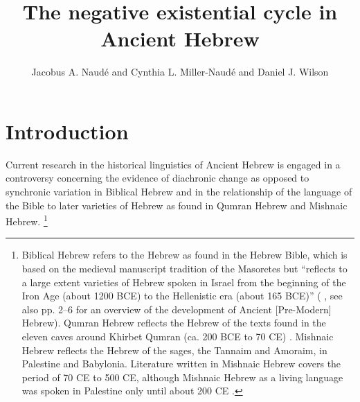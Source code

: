 \documentclass[output=paper,colorlinks,citecolor=brown,draft,draftmode]{langscibook}
\author{Jacobus A. Naudé\affiliation{University of the Free State} and Cynthia L. Miller-Naudé\affiliation{University of the Free State} and Daniel J. Wilson\affiliation{University of the Free State}
}
\title{The negative existential cycle in Ancient Hebrew}
\begin{document}
\maketitle

\section{Introduction}\label{sec:Hebrew-1}
\largerpage[-2]
Current research in the historical linguistics of Ancient Hebrew is engaged in a controversy concerning the evidence of diachronic
change as opposed to synchronic variation in Biblical Hebrew and in the
relationship of the language of the Bible to later varieties of Hebrew as
found in Qumran %
Hebrew and Mishnaic Hebrew.%
%
\footnote{Biblical Hebrew
refers to the Hebrew as found in the Hebrew Bible, which is based on the
medieval manuscript tradition of the Masoretes but ``reflects to a large
extent varieties of Hebrew spoken in Israel from the beginning of the Iron
Age (about 1200 BCE) to the Hellenistic era (about 165 BCE)'' (%
\citet*[1]{MerweNaude2017}, see also pp. 2--6 for an overview of the
development of Ancient [Pre-Modern] Hebrew). Qumran Hebrew reflects the
Hebrew of the texts found in the eleven caves around Khirbet Qumran (ca.
200 BCE to 70 CE)
\parencites(see)(){Naude2003}{NaudeMiller2016b}%
.
Mishnaic Hebrew reflects the Hebrew of the sages, the Tannaim and Amoraim,
in Palestine and Babylonia. Literature written in Mishnaic Hebrew covers
the period of 70 CE to 500 CE, although Mishnaic Hebrew as a living
language was spoken in Palestine only until about 200 CE \parencites[116]{BarAsher1999}[see also][5]{MerweNaude2017}{NaudeMiller2016b}.}%
\end{document}
